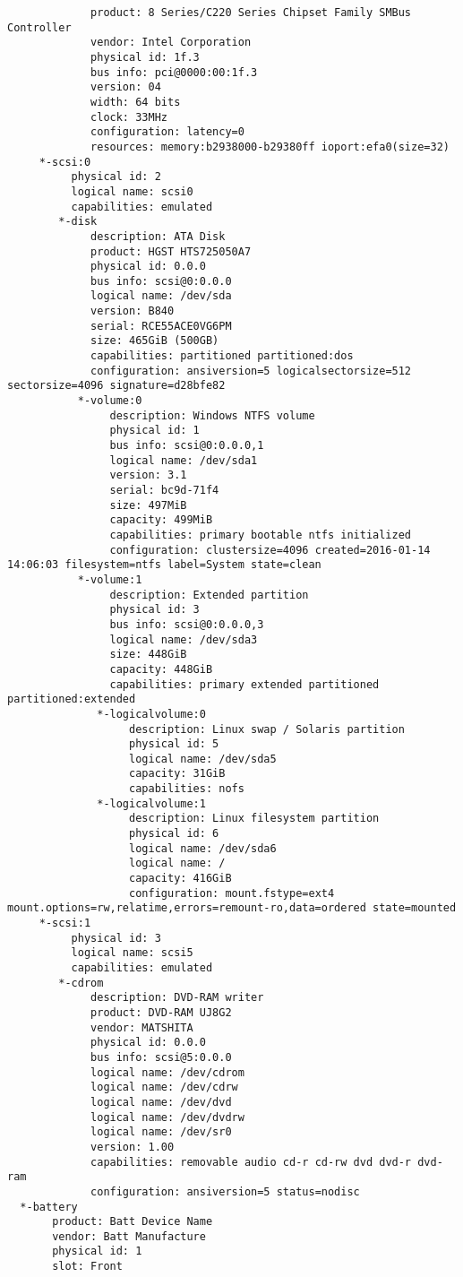 \begin{verbatim}
             product: 8 Series/C220 Series Chipset Family SMBus Controller
             vendor: Intel Corporation
             physical id: 1f.3
             bus info: pci@0000:00:1f.3
             version: 04
             width: 64 bits
             clock: 33MHz
             configuration: latency=0
             resources: memory:b2938000-b29380ff ioport:efa0(size=32)
     *-scsi:0
          physical id: 2
          logical name: scsi0
          capabilities: emulated
        *-disk
             description: ATA Disk
             product: HGST HTS725050A7
             physical id: 0.0.0
             bus info: scsi@0:0.0.0
             logical name: /dev/sda
             version: B840
             serial: RCE55ACE0VG6PM
             size: 465GiB (500GB)
             capabilities: partitioned partitioned:dos
             configuration: ansiversion=5 logicalsectorsize=512 sectorsize=4096 signature=d28bfe82
           *-volume:0
                description: Windows NTFS volume
                physical id: 1
                bus info: scsi@0:0.0.0,1
                logical name: /dev/sda1
                version: 3.1
                serial: bc9d-71f4
                size: 497MiB
                capacity: 499MiB
                capabilities: primary bootable ntfs initialized
                configuration: clustersize=4096 created=2016-01-14 14:06:03 filesystem=ntfs label=System state=clean
           *-volume:1
                description: Extended partition
                physical id: 3
                bus info: scsi@0:0.0.0,3
                logical name: /dev/sda3
                size: 448GiB
                capacity: 448GiB
                capabilities: primary extended partitioned partitioned:extended
              *-logicalvolume:0
                   description: Linux swap / Solaris partition
                   physical id: 5
                   logical name: /dev/sda5
                   capacity: 31GiB
                   capabilities: nofs
              *-logicalvolume:1
                   description: Linux filesystem partition
                   physical id: 6
                   logical name: /dev/sda6
                   logical name: /
                   capacity: 416GiB
                   configuration: mount.fstype=ext4 mount.options=rw,relatime,errors=remount-ro,data=ordered state=mounted
     *-scsi:1
          physical id: 3
          logical name: scsi5
          capabilities: emulated
        *-cdrom
             description: DVD-RAM writer
             product: DVD-RAM UJ8G2
             vendor: MATSHITA
             physical id: 0.0.0
             bus info: scsi@5:0.0.0
             logical name: /dev/cdrom
             logical name: /dev/cdrw
             logical name: /dev/dvd
             logical name: /dev/dvdrw
             logical name: /dev/sr0
             version: 1.00
             capabilities: removable audio cd-r cd-rw dvd dvd-r dvd-ram
             configuration: ansiversion=5 status=nodisc
  *-battery
       product: Batt Device Name
       vendor: Batt Manufacture
       physical id: 1
       slot: Front
\end{verbatim}